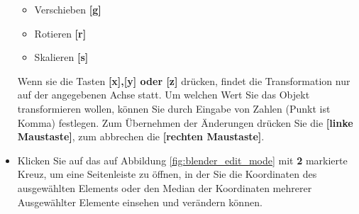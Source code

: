 \documentclass[10pt,a5paper,twoside,titlepage]{scrartcl}
\begin{document}
\begin{itemize}
	\begin{itemize}
		\item Verschieben \textbf{[g]}
		\item Rotieren \textbf{[r]}
		\item Skalieren \textbf{[s]}
	\end{itemize}
	Wenn sie die Tasten \textbf{[x],[y] oder [z]} drücken, findet die Transformation nur auf der angegebenen Achse statt. Um welchen Wert Sie das Objekt transformieren wollen, können Sie durch Eingabe von Zahlen (Punkt ist Komma) festlegen. Zum Übernehmen der Änderungen drücken Sie die \textbf{[linke Maustaste]}, zum abbrechen die \textbf{[rechten Maustaste]}.
	\item Klicken Sie auf das auf Abbildung \ref{fig:blender_edit_mode} mit \textbf{2} markierte Kreuz, um eine Seitenleiste zu öffnen, in der Sie die Koordinaten des ausgewählten Elements oder den Median der Koordinaten mehrerer Ausgewählter Elemente einsehen und verändern können.
	\end{itemize}
\end{document}
